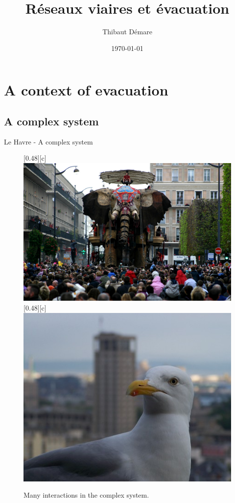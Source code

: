\documentclass{beamer}
\title{Réseaux viaires et évacuation}
\author{Thibaut Démare}
\institute{Stage de recherche\\Université du Havre}
\date{\today}
\begin{document}
\begin{frame} 
\titlepage
\end{frame}

\section{A context of evacuation}

	\subsection{A complex system}
	
\begin{frame}{Le Havre - A complex system}
	\begin{figure}[htbp]
		\centering
		[0.48\linewidth][c]{
			\includegraphics[width=0.48\linewidth]{./img/le_havre_system_complex_human.jpg}
		}
		[0.48\linewidth][c]{
			\includegraphics[width=0.48\linewidth]{./img/le_havre_system_complex_animal.jpg}
		}
		\caption{Many interactions in the complex system.}
		\label{fig:complex_systems_1}
	\end{figure}
\end{frame}
\end{document}
